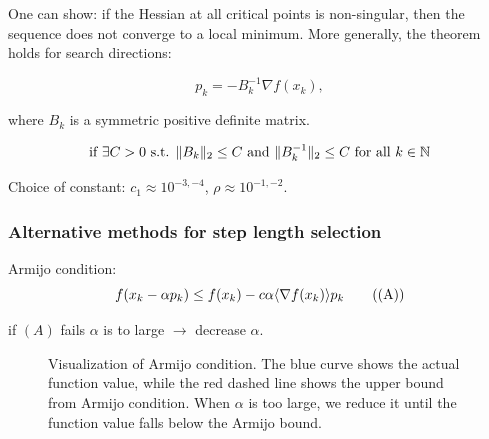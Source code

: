 One can show: if the Hessian at all critical points is non-singular, then the sequence does not converge to a local minimum.
More generally, the theorem holds for search directions:

\[
  p_k = - B_k^{-1} \nabla f(x_k),
\]

where  \(B_k\) is a symmetric positive definite matrix.

\[
  \text{if } \exists C > 0 \text{ s.t. } \lVert B_k\rVert_2 \leq C \text{ and } \lVert B_k^{-1}\rVert_2 \leq C \text{ for all } k \in \mathbb{N}
\]

Choice of constant:  \(c_1 \approx 10^{-3,-4}\),  \(\rho \approx 10^{-1,-2}\).

\subsubsection*{Alternative methods for step length selection}

Armijo condition:
\[
  f(x_k - \alpha p_k) \leq f(x_k) - c \alpha \langle\nabla f(x_k)\rangle{p_k} \tag{(A)}
\]

if  \((A)\) fails  \(\alpha\) is to large  \(\to\) decrease  \(\alpha\).

\begin{figure}[H]
  \centering
  \caption{Visualization of Armijo condition. The blue curve shows the actual function value, while the red dashed line shows the upper bound from Armijo condition. When  \(\alpha\) is too large, we reduce it until the function value falls below the Armijo bound.}
\end{figure}

